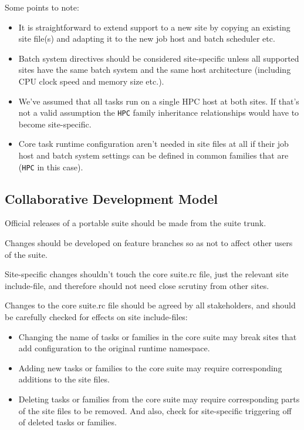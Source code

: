 Some points to note:

\begin{itemize}
  \item It is straightforward to extend support to a new site by copying an
    existing site file(s) and adapting it to the new job host and batch
    scheduler etc.

  \item Batch system directives should be considered site-specific unless
    all supported sites have the same batch system and the same host
    architecture (including CPU clock speed and memory size etc.).

  \item We've assumed that all tasks run on a single HPC host at both
    sites. If that's not a valid assumption the \lstinline=HPC= family
    inheritance relationships would have to become site-specific.

  \item Core task runtime configuration aren't needed in site files at all
    if their job host and batch system settings can be defined in common
    families that are (\lstinline=HPC= in this case).
\end{itemize}


\subsection{Collaborative Development Model}
\label{Collaborative Development Model}

Official releases of a portable suite should be made from the suite trunk.

Changes should be developed on feature branches so as not to affect other users
of the suite.

Site-specific changes shouldn't touch the core suite.rc file, just the relevant
site include-file, and therefore should not need close scrutiny from other
sites.

Changes to the core suite.rc file should be agreed by all stakeholders, and
should be carefully checked for effects on site include-files:

\begin{itemize}
  \item Changing the name of tasks or families in the core suite may break
    sites that add configuration to the original runtime namespace.
  \item Adding new tasks or families to the core suite may require
    corresponding additions to the site files.
  \item Deleting tasks or families from the core suite may require
    corresponding parts of the site files to be removed. And also, check for
    site-specific triggering off of deleted tasks or families.
\end{itemize}

